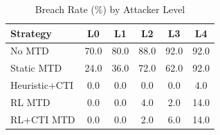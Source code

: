 \begin{table}[!t]
\centering
\caption{Breach Rate (\%) by Attacker Level}
\begin{tabular}{lccccc}
\toprule
\textbf{Strategy} & \textbf{L0} & \textbf{L1} & \textbf{L2} & \textbf{L3} & \textbf{L4} \\
\midrule
No MTD & 70.0 & 80.0 & 88.0 & 92.0 & 92.0 \\
Static MTD & 24.0 & 36.0 & 72.0 & 62.0 & 92.0 \\
Heuristic+CTI & 0.0 & 0.0 & 0.0 & 0.0 & 4.0 \\
RL MTD & 0.0 & 0.0 & 4.0 & 2.0 & 14.0 \\
RL+CTI MTD & 0.0 & 0.0 & 2.0 & 6.0 & 14.0 \\
\bottomrule
\end{tabular}
\end{table}
